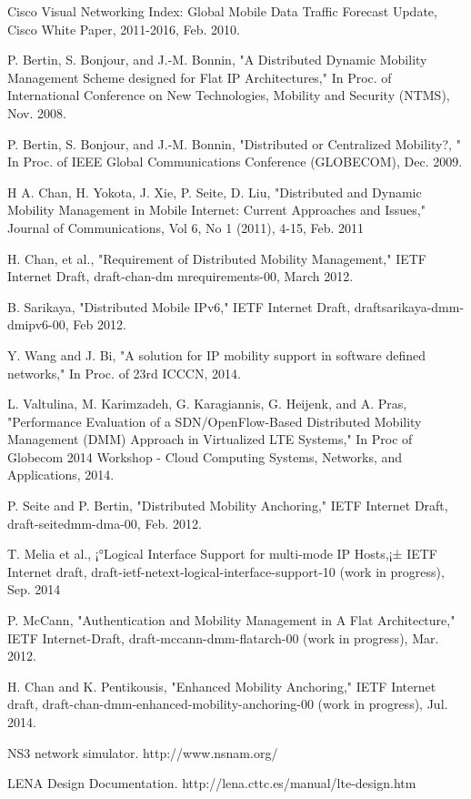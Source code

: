 \documentclass[runningheads,a4paper]{llncs}
\begin{document}
\begin{thebibliography}{4}

 Cisco Visual Networking Index: Global Mobile Data Traffic Forecast Update,  Cisco White Paper, 2011-2016, Feb. 2010.

 P. Bertin, S. Bonjour, and J.-M. Bonnin, "A Distributed Dynamic Mobility Management Scheme designed for Flat IP Architectures," In Proc. of International Conference on New Technologies, Mobility and Security (NTMS), Nov. 2008.

 P. Bertin, S. Bonjour, and J.-M. Bonnin, "Distributed or Centralized Mobility?, " In Proc. of IEEE Global Communications Conference (GLOBECOM), Dec. 2009.

 H A. Chan, H. Yokota, J. Xie, P. Seite, D. Liu, "Distributed and Dynamic Mobility Management in Mobile Internet: Current Approaches and Issues," Journal of Communications, Vol 6, No 1 (2011), 4-15, Feb. 2011

 H. Chan, et al., "Requirement of Distributed Mobility Management," IETF Internet Draft, draft-chan-dm mrequirements-00, March 2012.

 B. Sarikaya, "Distributed Mobile IPv6," IETF Internet Draft, draftsarikaya-dmm-dmipv6-00, Feb 2012.

 Y. Wang and J. Bi, "A solution for IP mobility support in software defined networks," In Proc. of 23rd ICCCN, 2014.

 L. Valtulina, M. Karimzadeh, G. Karagiannis, G. Heijenk, and A. Pras, "Performance Evaluation of a SDN/OpenFlow-Based Distributed Mobility Management (DMM) Approach in Virtualized LTE Systems," In Proc of Globecom 2014 Workshop - Cloud Computing Systems, Networks, and Applications, 2014.

 P. Seite and P. Bertin, "Distributed Mobility Anchoring," IETF Internet Draft, draft-seitedmm-dma-00, Feb. 2012.

 T. Melia et al., ¡°Logical Interface Support for multi-mode IP Hosts,¡± IETF Internet draft, draft-ietf-netext-logical-interface-support-10 (work in progress), Sep. 2014

 P. McCann, "Authentication and Mobility Management in A Flat Architecture," IETF Internet-Draft, draft-mccann-dmm-flatarch-00 (work in progress), Mar. 2012.

 H. Chan and K. Pentikousis, "Enhanced Mobility Anchoring," IETF Internet draft, draft-chan-dmm-enhanced-mobility-anchoring-00 (work in progress), Jul. 2014.

 NS3 network simulator. http://www.nsnam.org/

 LENA Design Documentation. http://lena.cttc.es/manual/lte-design.htm

\end{thebibliography}
\end{document}
